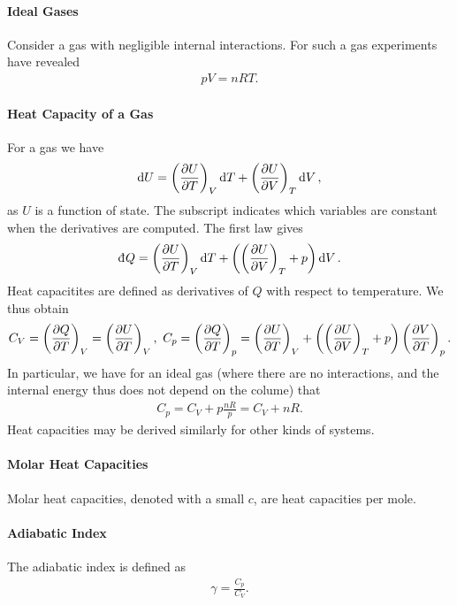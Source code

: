 \paragraph{Ideal Gases}
Consider a gas with negligible internal interactions. For such a gas experiments have revealed
\begin{align*}
	pV = nRT.
\end{align*}

\paragraph{Heat Capacity of a Gas}
For a gas we have
\begin{align*}
	\dd{U} = \fix{\pdv{U}{T}}{V}\dd{T} + \fix{\pdv{U}{V}}{T}\dd{V},
\end{align*}
as $U$ is a  function of state. The subscript indicates which variables are constant when the derivatives are computed. The first law gives
\begin{align*}
	\din{Q} = \fix{\pdv{U}{T}}{V}\dd{T} + \left(\fix{\pdv{U}{V}}{T} + p\right)\dd{V}.
\end{align*}
Heat capacitites are defined as derivatives of $Q$ with respect to temperature. We thus obtain
\begin{align*}
	C_{V} = \fix{\pdv{Q}{T}}{V} = \fix{\pdv{U}{T}}{V},\ C_{p} = \fix{\pdv{Q}{T}}{p} = \fix{\pdv{U}{T}}{V} + \left(\fix{\pdv{U}{V}}{T} + p\right)\fix{\pdv{V}{T}}{p}.
\end{align*}
In particular, we have for an ideal gas (where there are no interactions, and the internal energy thus does not depend on the colume) that
\begin{align*}
	C_{p} = C_{V} + p\frac{nR}{p} = C_{V} + nR.
\end{align*}
Heat capacities may be derived similarly for other kinds of systems.

\paragraph{Molar Heat Capacities}
Molar heat capacities, denoted with a small $c$, are heat capacities per mole.

\paragraph{Adiabatic Index}
The adiabatic index is defined as
\begin{align*}
	\gamma = \frac{C_{p}}{C_{V}}.
\end{align*}

